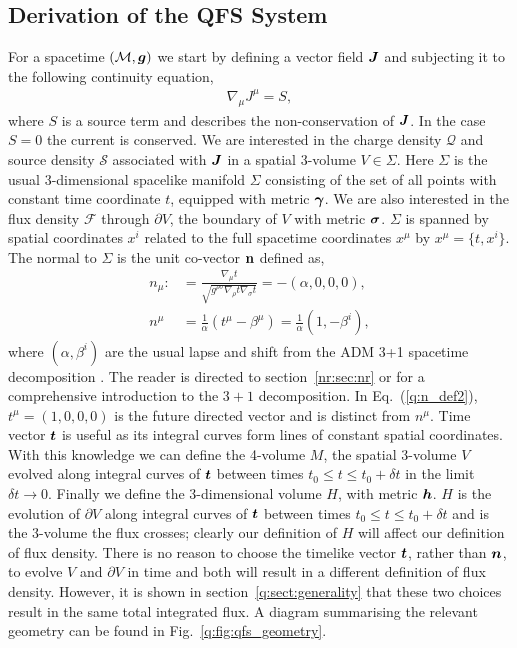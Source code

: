 \subsection{Derivation of the QFS System} \label{q:sect:derive}
For a spacetime $(\mathcal{M},\boldsymbol{g})$ we start by defining a vector field $\boldsymbol{J}$ and subjecting it to the following continuity equation,
\begin{align}
\label{q:continuity_eqn_def}\nabla_\mu J^\mu = S,
\end{align}
where $S$ is a source term and describes the non-conservation of $\boldsymbol{J}$. In the case $S=0$ the current is conserved. We are interested in the charge density $\mathcal{Q}$ and source density $\mathcal{S}$ associated with $\boldsymbol{J}$ in a spatial 3-volume $V\in\Sigma$. Here $\Sigma$ is the usual 3-dimensional spacelike manifold $\Sigma$ consisting of the set of all points with constant time coordinate $t$, equipped with metric $\boldsymbol{\gamma}$. We are also interested in the flux density $\mathcal{F}$ through $\partial V$, the boundary of $V$ with metric $\boldsymbol{\sigma}$. $\Sigma$ is spanned by spatial coordinates $x^i$ related to the full spacetime coordinates $x^\mu$ by $ x^\mu = \{t,x^i \}$. The normal to $\Sigma$ is the unit co-vector $\bf{n}$ defined as, 
\begin{align}
\label{q:n_def}
n_\mu :&= \frac{\nabla_\mu t}{\sqrt{g^{\rho\sigma}\nabla_\rho t \nabla_\sigma t}} = -(\alpha,0,0,0), \\
\label{q:n_def2} n^\mu &= \frac{1}{\alpha}\left(t^\mu - \beta^\mu \right)= \frac{1}{\alpha} (1, -\beta^i ) , 
\end{align} 
where $(\alpha,\beta^i)$ are the usual lapse and shift from the ADM 3+1 spacetime decomposition \cite{2008}. The reader is directed to section~\ref{nr:sec:nr} or \cite{gourgoulhon20073+} for a comprehensive introduction to the $3+1$ decomposition. In Eq.~(\ref{q:n_def2}), $t^\mu = (1,0,0,0)$ is the future directed vector and is distinct from $n^\mu$. Time vector $\boldsymbol{t}$ is useful as its integral curves form lines of constant spatial coordinates. With this knowledge we can define the 4-volume $M$, the spatial 3-volume $V$ evolved along integral curves of $\boldsymbol{t}$ between times $t_0\leq t\leq t_0 + \delta t$ in the limit $\delta t\rightarrow 0$. Finally we define the 3-dimensional volume $H$, with metric $\boldsymbol h$. $H$ is the evolution of $\partial V$ along integral curves of $\boldsymbol{t}$ between times $t_0\leq t \leq t_0 + \delta t$ and is the 3-volume the flux crosses; clearly our definition of $H$ will affect our definition of flux density. There is no reason to choose the timelike vector $\boldsymbol{t}$, rather than $\boldsymbol{n}$, to evolve $V$ and $\partial V$ in time and both will result in a different definition of flux density. However, it is shown in section~\ref{q:sect:generality} that these two choices result in the same total integrated flux. A diagram summarising the relevant geometry can be found in Fig.~\ref{q:fig:qfs_geometry}.

